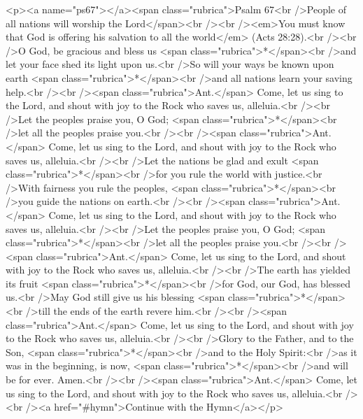 <p><a name="ps67"></a><span class="rubrica">Psalm 67<br />People of all nations will worship the Lord</span><br /><br /><em>You must know that God is offering his salvation to all the world</em> (Acts 28:28).<br /><br />O God, be gracious and bless us <span class="rubrica">*</span><br />and let your face shed its light upon us.<br />So will your ways be known upon earth <span class="rubrica">*</span><br />and all nations learn your saving help.<br /><br /><span class="rubrica">Ant.</span> Come, let us sing to the Lord, and shout with joy to the Rock who saves us, alleluia.<br /><br />Let the peoples praise you, O God; <span class="rubrica">*</span><br />let all the peoples praise you.<br /><br /><span class="rubrica">Ant.</span> Come, let us sing to the Lord, and shout with joy to the Rock who saves us, alleluia.<br /><br />Let the nations be glad and exult <span class="rubrica">*</span><br />for you rule the world with justice.<br />With fairness you rule the peoples, <span class="rubrica">*</span><br />you guide the nations on earth.<br /><br /><span class="rubrica">Ant.</span> Come, let us sing to the Lord, and shout with joy to the Rock who saves us, alleluia.<br /><br />Let the peoples praise you, O God; <span class="rubrica">*</span><br />let all the peoples praise you.<br /><br /><span class="rubrica">Ant.</span> Come, let us sing to the Lord, and shout with joy to the Rock who saves us, alleluia.<br /><br />The earth has yielded its fruit <span class="rubrica">*</span><br />for God, our God, has blessed us.<br />May God still give us his blessing <span class="rubrica">*</span><br />till the ends of the earth revere him.<br /><br /><span class="rubrica">Ant.</span> Come, let us sing to the Lord, and shout with joy to the Rock who saves us, alleluia.<br /><br />Glory to the Father, and to the Son, <span class="rubrica">*</span><br />and to the Holy Spirit:<br />as it was in the beginning, is now, <span class="rubrica">*</span><br />and will be for ever. Amen.<br /><br /><span class="rubrica">Ant.</span> Come, let us sing to the Lord, and shout with joy to the Rock who saves us, alleluia.<br /><br /><a href="#hymn">Continue with the Hymn</a></p>
